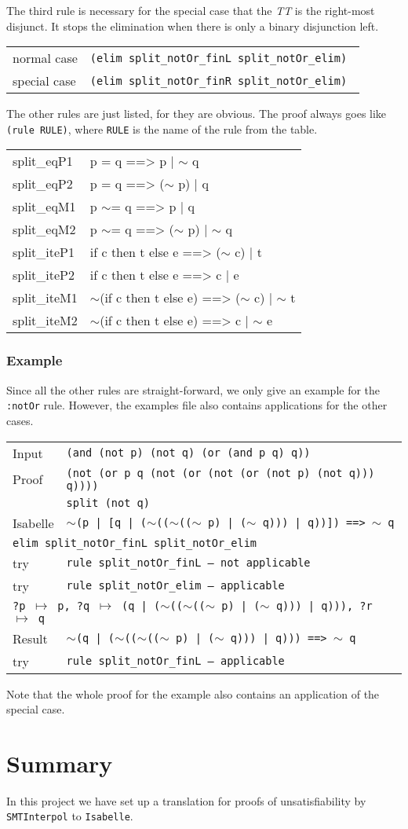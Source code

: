 \documentclass[10pt,a4paper]{article}
\newcommand{\si}{\texttt{SMTInterpol}\xspace}
\newcommand{\isa}{\texttt{Isabelle}\xspace}
\newcommand{\ttt}{\texttt}
\newcommand{\negat}{\ensuremath{\sim}}
\newcommand{\nega}{\negat\xspace}
\newcommand{\pat}[2]{\ttt{?#1} $\mapsto$ \ttt{#2}}
\newcommand{\TTx}{\emph{TT}}
\newcommand{\TT}{\TTx\xspace}
\newenvironment{pt}[1]{\begin{center}\begin{tt}\begin{tabular}{#1}\hline}{\end{tabular}\end{tt}\end{center}}
\newcommand{\pl}[1]{#1 \\[1mm]}
\newcommand{\pll}[1]{#1 \\\hline}
\newenvironment{rt}{\begin{center}\begin{tabular}{|l l|}\hline}{\end{tabular}\end{center}}
\newcommand{\rl}[2]{\rm{#1} & \tt{#2} \\[1mm]}
\newcommand{\rll}[2]{\rm{#1} & \tt{#2} \\\hline}
\def\ind{\quad}
\newcommand{\exl}[2]{\exlm{#1}{\ttt{#2}}}
\newcommand{\exlm}[2]{#1 & #2 \\[1mm]}
\newcommand{\exmc}[2]{\multicolumn{2}{l}{\ttt{#1} #2} \\[1mm]}
\begin{document}
The third rule is necessary for the special case that the \TT is the right-most disjunct. It stops the elimination when there is only a binary disjunction left.
%
\begin{rt}
	\rl{normal case}{(elim split\_notOr\_finL split\_notOr\_elim)}
	\rll{special case}{(elim split\_notOr\_finR split\_notOr\_elim)}
\end{rt}
%
The other rules are just listed, for they are obvious. The proof always goes like \ttt{(rule RULE)}, where \ttt{RULE} is the name of the rule from the table.
%
\begin{pt}{ll}
	\pl{split\_eqP1 & p = q ==> p | \nega q}
	\pl{split\_eqP2 & p = q ==> (\nega p) | q}
	\pl{split\_eqM1 & p \negat= q ==> p | q}
	\pl{split\_eqM2 & p \negat= q ==> (\nega p) | \nega q}
	\pl{split\_iteP1 & if c then t else e ==> (\nega c) | t}
	\pl{split\_iteP2 & if c then t else e ==> c | e}
	\pl{split\_iteM1 & \nega (if c then t else e) ==> (\nega c) | \nega t}
	\pll{split\_iteM2 & \nega (if c then t else e) ==> c | \nega e}
\end{pt}
%
\subsubsection*{Example}
Since all the other rules are straight-forward, we only give an example for the \ttt{:notOr} rule. However, the examples file also contains applications for the other cases.
%
\begin{center}
	\begin{tabular}{ll}
		\exl{Input}{(and (not p) (not q) (or (and p q) q))}
		\exlm{Proof}{\ttt{(not (or p q (not (or (not (or (not p) (not q))) q))))} \\ & \ind \ttt{split (not q)}}
		\exl{Isabelle}{\nega (p | [q | (\nega ((\nega ((\nega p) | (\nega q))) | q))]) ==> \nega q}
		\exmc{elim split\_notOr\_finL split\_notOr\_elim}{}
		\exl{try}{rule split\_notOr\_finL \rm{-- not applicable}}
		\exl{try}{rule split\_notOr\_elim \rm{-- applicable}}
		\exmc{\ind \pat{p}{p}, \pat{q}{(q | (\nega ((\nega ((\nega p) | (\nega q))) | q)))}, \pat{r}{q}}{}
		\exl{Result}{\nega (q | (\nega ((\nega ((\nega p) | (\nega q))) | q))) ==> \nega q}
		\exl{try}{rule split\_notOr\_finL \rm{-- applicable}}
	\end{tabular}
\end{center}

Note that the whole proof for the example also contains an application of the special case.
%
\section{Summary}\label{sec:summary}
In this project we have set up a translation for proofs of unsatisfiability by \si to \isa.
\end{document}
